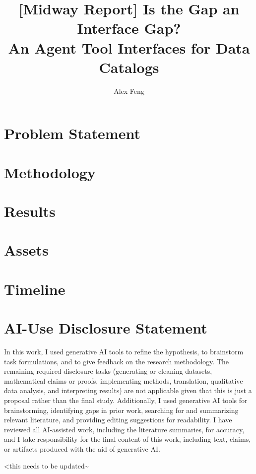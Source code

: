 \documentclass{article}
\title{[Midway Report] Is the Gap an Interface Gap?\\ An Agent Tool Interfaces for Data Catalogs}
\author{Alex Feng}
\begin{document}
\maketitle
\vspace{-0.3in}

\section{Problem Statement}



\section{Methodology}



\section{Results}



\section{Assets}



\section{Timeline}



\clearpage



\appendix
\section{AI-Use Disclosure Statement}
In this work, I used generative AI tools to refine the
hypothesis, to brainstorm task formulations, and to
give feedback on the research methodology. The remaining required-disclosure tasks
(generating or cleaning datasets, mathematical claims or proofs,
implementing methods, translation, qualitative data analysis, and
interpreting results) are not applicable given that this is just a proposal rather than the final study. Additionally, I used generative AI
tools for brainstorming, identifying gaps in prior work, searching for
and summarizing relevant literature, and
providing editing suggestions for readability. I have reviewed
all AI-assisted work, including the literature summaries, for accuracy, and I take
responsibility for the final content of this work, including text,
claims, or artifacts produced with the aid of generative AI.

<this needs to be updated^^>
\end{document}
